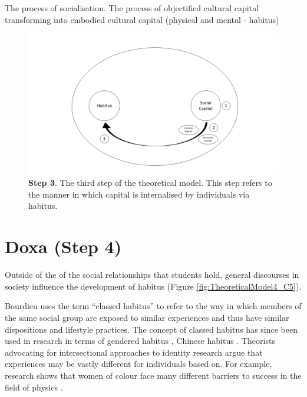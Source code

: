 The process of socialisation.
The process of objectified cultural capital transforming into embodied cultural capital (physical and mental - habitus)

\begin{figure}[ht]
\centering
\includegraphics[width=\textwidth]{C5 - Understanding Capital Accumulation/HabitusSocCap_TheoreticalModel3.png}
\caption{\label{fig:TheoreticalModel3_C5}\textbf{Step 3}. The third step of the theoretical model. This step refers to the manner in which capital is internalised by individuals via habitus.}
\end{figure}



\section{Doxa (Step 4)}
Outside of the of the social relationships that students hold, general discourses in society influence the development of habitus (Figure \ref{fig:TheoreticalModel4_C5}). 

Bourdieu uses the term ``classed habitus'' to refer to the way in which members of the same social group are exposed to similar experiences and thus have similar dispositions and lifestyle practices. The concept of classed habitus has since been used in research in terms of gendered habitus \citep{Reay_2004}, Chinese habitus \citep{Mu2014}. Theorists advocating for intersectional approaches to identity research argue that experiences may be vastly different for individuals based on. For example, research shows that women of colour face many different barriers to success in the field of physics \cite{ong2005body}.

